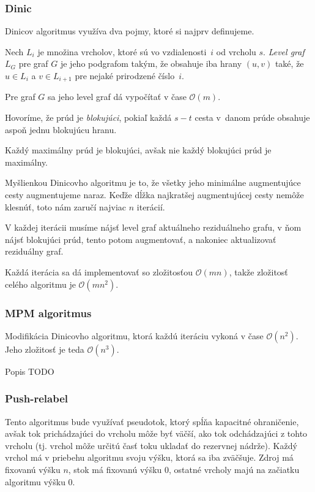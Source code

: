 \subsubsection{Dinic}
Dinicov algoritmus využíva dva pojmy, ktoré si najprv definujeme.

\begin{definition}
Nech $L_i$ je množina vrcholov, ktoré sú vo vzdialenosti~$i$ od
vrcholu $s$. {\em Level graf} $L_G$ pre graf $G$ je jeho podgrafom
takým, že obsahuje iba hrany $(u,v)$ také, že $u \in L_i$ a 
$v \in L_{i+1}$ pre nejaké prirodzené číslo~$i$.
\end{definition}

Pre graf $G$ sa jeho level graf dá vypočítať v čase $\mathcal{O}(m)$.

\begin{definition}
Hovoríme, že prúd je {\em blokujúci}, pokiaľ každá $s-t$ cesta v~danom
prúde obsahuje aspoň jednu blokujúcu hranu. 
\end{definition}

\begin{lemma}
	Každý maximálny prúd je blokujúci, avšak nie každý blokujúci prúd
	je maximálny.
\end{lemma}

Myšlienkou Dinicovho algoritmu je to, že všetky jeho minimálne augmentujúce
cesty augmentujeme naraz. Keďže dĺžka najkratšej augmentujúcej cesty
nemôže klesnúť, toto nám zaručí najviac $n$ iterácií.

V každej iterácii musíme nájsť level graf aktuálneho reziduálneho grafu,
v ňom nájsť blokujúci prúd, tento potom augmentovať, a nakoniec 
aktualizovať reziduálny graf.

Každá iterácia sa dá implementovať so zložitosťou $\mathcal{O}(mn)$, takže
zložitosť celého algoritmu je $\mathcal{O}(mn^2)$.

\subsubsection{MPM algoritmus}
Modifikácia Dinicovho algoritmu, ktorá každú iteráciu vykoná v čase $\mathcal{O}(n^2)$.
Jeho zložitosť je teda $\mathcal{O}(n^3)$.

Popis TODO

\subsubsection{Push-relabel}
Tento algoritmus bude využívať pseudotok, ktorý spĺňa kapacitné
ohraničenie, avšak tok prichádzajúci do vrcholu môže byť väčší, 
ako tok odchádzajúci z tohto vrcholu (tj. vrchol môže určitú časť
toku ukladať do rezervnej nádrže). Každý vrchol má v priebehu 
algoritmu svoju výšku, ktorá sa iba zväčšuje. Zdroj má fixovanú
výšku $n$, stok má fixovanú výšku $0$, ostatné vrcholy majú na začiatku
algoritmu výšku $0$.

